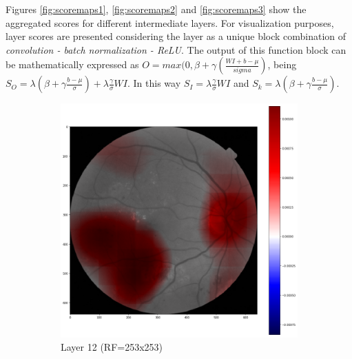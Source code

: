 \documentclass[review]{elsarticle}
\theoremstyle{definition} %
\theoremstyle{remark}
\begin{document}
Figures \ref{fig:scoremaps1}, \ref{fig:scoremaps2} and \ref{fig:scoremaps3} show the aggregated scores for different intermediate layers. For visualization purposes, layer scores are presented considering the layer as a unique block combination of \emph{convolution - batch normalization - ReLU}. The output of this function block can be mathematically expressed as $O = max(0, \beta + \gamma(\frac{WI + b - \mu}{sigma})$, being $S_O = \lambda (\beta + \gamma \frac{b - \mu}{\sigma}) + \lambda \frac{\gamma}{\sigma}WI$. In this way $S_I = \lambda \frac{\gamma}{\sigma}WI$ and $S_k = \lambda (\beta + \gamma \frac{b - \mu}{\sigma})$. 

\begin{figure}[!ht]
	\centering
	\begin{subfigure}{0.45\textwidth}
		\includegraphics[width=\textwidth]{./figures/maps/rf253c.png}
		\caption{Layer 12 (RF=253x253)}
		\label{fig:score_rf253}
	\end{subfigure}
	~ %
	\begin{subfigure}{0.45\textwidth}

\end{subfigure}
\end{figure}
\end{document}

